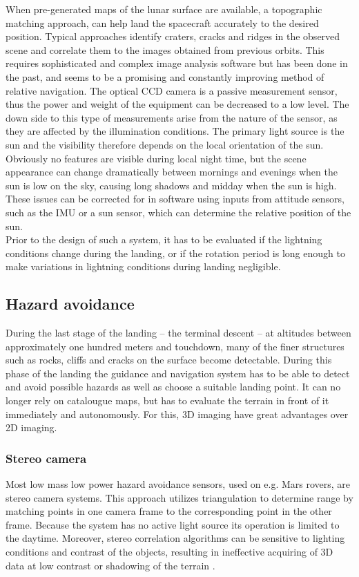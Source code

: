 When pre-generated maps of the lunar surface are available, a topographic matching approach, can help land the spacecraft accurately to the desired position. Typical approaches identify craters, cracks and ridges in the observed scene and correlate them to the images obtained from previous orbits. This requires sophisticated and complex image analysis software but has been done in the past, and seems to be a promising and constantly improving method of relative navigation. The optical CCD camera is a passive measurement sensor, thus the power and weight of the equipment can be decreased to a low level. The down side to this type of measurements arise from the nature of the sensor, as they are affected by the illumination conditions. The primary light source is the sun and the visibility therefore depends on the local orientation of the sun. Obviously no features are visible during local night time, but the scene appearance can change dramatically between mornings and evenings when the sun is low on the sky, causing long shadows and midday when the sun is high. These issues can be corrected for in software using inputs from attitude sensors, such as the IMU or a sun sensor, which can determine the relative position of the sun.\\
Prior to the design of such a system, it has to be evaluated if the lightning conditions change during the landing, or if the rotation period is long enough to make variations in lightning conditions during landing negligible. 


\subsection{Hazard avoidance}

During the last stage of the landing – the terminal descent – at altitudes between approximately one hundred meters and touchdown, many of the finer structures such as rocks, cliffs and cracks on the surface become detectable. During this phase of the landing the guidance and navigation system has to be able to detect and avoid possible hazards as well as choose a suitable landing point. It can no longer rely on catalougue maps, but has to evaluate the terrain in front of it immediately and autonomously. For this, 3D imaging have great advantages over 2D imaging. 



\subsubsection{Stereo camera}
Most low mass low power hazard avoidance sensors, used on e.g. Mars rovers, are stereo camera systems. This approach utilizes triangulation to determine range by matching points in one camera frame to the corresponding point in the other frame. Because the system has no active light source its operation is limited to the daytime. Moreover, stereo correlation algorithms can be sensitive to lighting conditions and contrast of the objects, resulting in ineffective acquiring of 3D data at low contrast or shadowing of the terrain \cite{structuredlight}.
 

